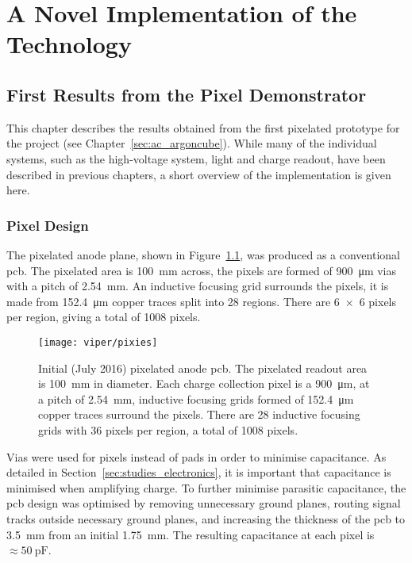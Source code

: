 \chapter{A Novel Implementation of the  Technology}
\label{chap:ac}


\section{First Results from the \AC{} Pixel Demonstrator}
\label{sec:ac_viper}

This chapter describes the results obtained from the first pixelated \lartpc{} prototype for the \AC{} project (see Chapter~\ref{sec:ac_argoncube}).
While many of the individual systems, such as the high-voltage system, light and charge readout, have been described in previous chapters, a short overview of the implementation is given here.


\subsection{Pixel  Design}
\label{sec:ac_viper_pcb}
 
The pixelated anode plane, shown in Figure~\ref{fig:viper_pixies}, was produced as a conventional \gls{pcb}. 
The pixelated area is \SI{100}{\milli\metre} across, the pixels are formed of \SI{900}{\micro\metre} vias with a pitch of \SI{2.54}{\milli\metre}.
An inductive focusing grid surrounds the pixels, it is made from \SI{152.4}{\micro\metre} copper traces split into 28 regions.
There are \num{6 x 6} pixels per region, giving a total of 1008 pixels. 

\begin{figure}[htb]
	\centering
	\texttt{[image: viper/pixies]}
	\caption{Initial (July 2016) pixelated anode \gls{pcb}. The pixelated readout area is \SI{100}{\milli\metre} in diameter.
	Each charge collection pixel is a \SI{900}{\micro\metre}, at a pitch of \SI{2.54}{\milli\metre}, inductive focusing grids formed of \SI{152.4}{\micro\metre} copper traces surround the pixels.
	There are 28 inductive focusing grids with 36 pixels per region, a total of 1008 pixels.}
	\label{fig:viper_pixies}
\end{figure}

Vias were used for pixels instead of pads in order to minimise capacitance.
As detailed in Section~\ref{sec:studies_electronics}, it is important that capacitance is minimised when amplifying charge.
To further minimise parasitic capacitance, the \gls{pcb} design was optimised by removing unnecessary ground planes, routing signal tracks outside necessary ground planes, and increasing the thickness of the \gls{pcb} to \SI{3.5}{\milli\metre} from an initial \SI{1.75}{\milli\metre}. 
The resulting capacitance at each pixel is $\approx \SI{50}{\pico\farad}$.

